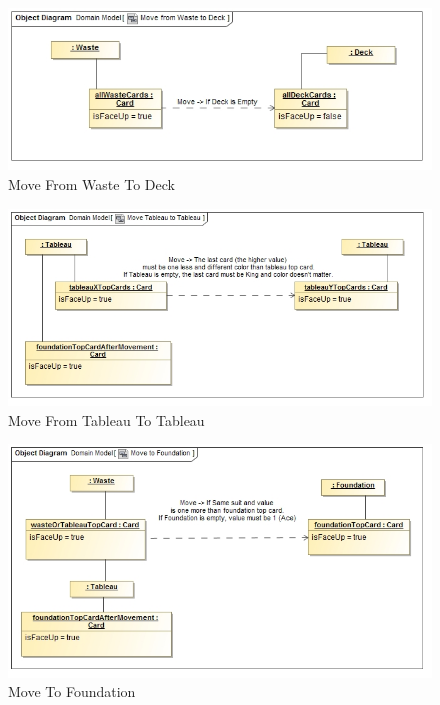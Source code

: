 \documentclass[11pt]{article}
\begin{document}
\begin{center}
 \begin{figure}[H]
 \begin{center}
   \includegraphics[width=15cm]{DomainModel/MoveFromWasteToDeck00.jpg}
   \caption{Move From Waste To Deck}
   \label{fig:waste2deck}
 \end{center}
 \end{figure}
\end{center}

\begin{center}
 \begin{figure}[H]
 \begin{center}
   \includegraphics[width=15cm]{DomainModel/MoveTableauToTableau00.jpg}
   \caption{Move From Tableau To Tableau}
   \label{fig:tableautotableau}
 \end{center}
 \end{figure}
\end{center}

\begin{center}
 \begin{figure}[H]
 \begin{center}
   \includegraphics[width=15cm]{DomainModel/MoveToFoundation00.jpg}
   \caption{Move To Foundation}
   \label{fig:tofoundation}
 \end{center}
 \end{figure}
\end{center}
\end{document}
